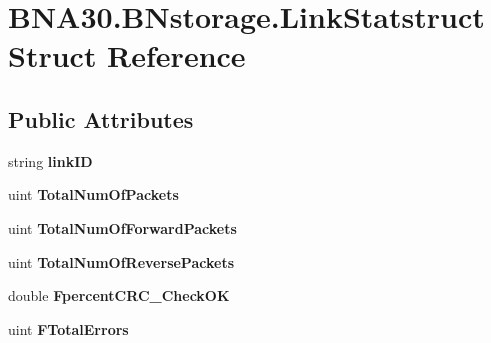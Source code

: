 \hypertarget{struct_b_n_a30_1_1_b_nstorage_1_1_link_statstruct}{}\section{B\+N\+A30.\+B\+Nstorage.\+Link\+Statstruct Struct Reference}
\label{struct_b_n_a30_1_1_b_nstorage_1_1_link_statstruct}
\subsection*{Public Attributes}
\begin{DoxyCompactItemize}
\item 
\mbox{\label{struct_b_n_a30_1_1_b_nstorage_1_1_link_statstruct_a9c56c90c8d040bdb54d2f7de94c41dc3}} 
string {\bfseries link\+ID}
\item 
\mbox{\label{struct_b_n_a30_1_1_b_nstorage_1_1_link_statstruct_a18b7456d246717e750ab0b4c665bfe4d}} 
uint {\bfseries Total\+Num\+Of\+Packets}
\item 
\mbox{\label{struct_b_n_a30_1_1_b_nstorage_1_1_link_statstruct_a92e0a6b71afcaeac93781717fa73b0e6}} 
uint {\bfseries Total\+Num\+Of\+Forward\+Packets}
\item 
\mbox{\label{struct_b_n_a30_1_1_b_nstorage_1_1_link_statstruct_a89874d3b9ec4733621aa3be11b944e35}} 
uint {\bfseries Total\+Num\+Of\+Reverse\+Packets}
\item 
\mbox{\label{struct_b_n_a30_1_1_b_nstorage_1_1_link_statstruct_a281cd2fd2fde0036d60a99459d86ca41}} 
double {\bfseries Fpercent\+C\+R\+C\+\_\+\+Check\+OK}
\item 
\mbox{\label{struct_b_n_a30_1_1_b_nstorage_1_1_link_statstruct_aafc191c001894c1d9cfa8d4daf78cb8e}} 
uint {\bfseries F\+Total\+Errors}
\item 
\mbox{\label{struct_b_n_a30_1_1_b_nstorage_1_1_link_statstruct_a4b80cb3d55ac6a688191fd655d91427e}} 

\end{DoxyCompactItemize}
